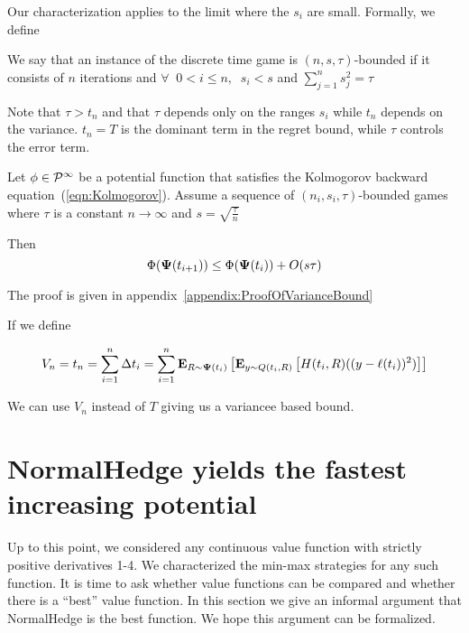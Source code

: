 \documentclass{article}[12pt]
\begin{document}
Our characterization applies to the limit where the $s_i$ are small. Formally, we define
\begin{definition}
We say that an instance of the discrete time game is
$(n,s,\tau)$-bounded if it consists of $n$ iterations and $\forall\;\; 0<i\leq n,\;\; s_i < s$ and $\sum_{j=1}^n s_j^2=\tau$
\end{definition}

Note that $\tau>t_n$ and that $\tau$ depends only on the ranges $s_i$
while $t_n$ depends on the variance. $t_n = T$ 
is the dominant term in the regret bound, while $\tau$ controls the
error term.

\begin{theorem} \label{thm:variancebound} Let $\phi \in {\cal P}^{\infty}$
  be a potential function that satisfies the Kolmogorov backward
  equation~(\ref{eqn:Kolmogorov}).
  Assume a sequence of $(n_i,s_i,\tau)$-bounded games where $\tau$ is
  a constant $n \to \infty$ and $s = \sqrt{\frac{\tau}{n}}$

Then 
$$\Phi({\bf \Psi}(t_{i+1})) \leq \Phi({\bf \Psi}(t_i))+O(s \tau)$$
\end{theorem}

The proof is given in appendix~\ref{appendix:ProofOfVarianceBound}

If we define

\begin{equation} \label{eqn:Vn}
  V_n = t_n = \sum_{i=1}^n \Delta t_i= 
  \sum_{i=1}^n {\bf E}_{R \sim {\bf \Psi}(t_i)}\left[ {\bf E}_{y \sim Q(t_i,R)}\left[ H(t_i,R) ((y-\ell(t_i))^2) \right] \right]
\end{equation}

We can use $V_n$ instead of $T$ giving us a variancee based bound.

  

\section{NormalHedge yields the fastest increasing potential} \label{sec:NormalHedge}

Up to this point, we considered any continuous value function with
strictly positive derivatives 1-4. We characterized the min-max
strategies for any such function. It is time to ask whether value
functions can be compared and whether there is a ``best'' value
function. In this section we give an informal argument that
NormalHedge is the best function. We hope this argument can be
formalized.
\end{document}
